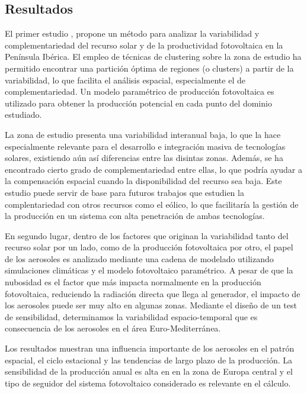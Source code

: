 \subsection{Resultados}

El primer estudio \cite*{Gutierrez2017}, propone un método para analizar la variabilidad y complementariedad del recurso solar y de la productividad fotovoltaica en la Península Ibérica. El empleo de técnicas de clustering sobre la zona de estudio ha permitido encontrar una partición óptima de regiones (o clusters) a partir de la variabilidad, lo que facilita el análisis espacial, especialmente el de complementariedad. Un modelo paramétrico de producción fotovoltaica es utilizado para obtener la producción potencial en cada punto del dominio estudiado.

La zona de estudio presenta una variabilidad interanual baja, lo que la hace especialmente relevante para el desarrollo e integración masiva de tecnologías solares, existiendo aún así diferencias entre las disintas zonas. Además, se ha encontrado cierto grado de complementariedad entre ellas, lo que podría ayudar a la compensación espacial cuando la disponibilidad del recurso sea baja. Este estudio puede servir de base para futuros trabajos que estudien la complentariedad con otros recursos como el eólico, lo que facilitaría la gestión de la producción en un sistema con alta penetración de ambas tecnologías.\\

\starbreak

En segundo lugar, dentro de los factores que originan la variabilidad tanto del recurso solar por un lado, como de la producción fotovoltaica por otro, el papel de los aerosoles es analizado mediante una cadena de modelado utilizando simulaciones climáticas y el modelo fotovoltaico param\'etrico. A pesar de que la nubosidad es el factor que más impacta normalmente en la producción fotovoltaica, reduciendo la radiación directa que llega al generador, el impacto de los aerosoles puede ser muy alto en algunas zonas. Mediante el diseño de un test de sensibilidad, determinamos la variabilidad espacio-temporal que es consecuencia de los aerosoles en el área Euro-Mediterránea.

Los resultados \cite*{Gutierrez2018} muestran una influencia importante de los aerosoles en el patrón espacial, el ciclo estacional y las tendencias de largo plazo de la producción. La sensibilidad de la producción anual es alta en en la zona de Europa central y el tipo de seguidor del sistema fotovoltaico considerado es relevante en el cálculo.

